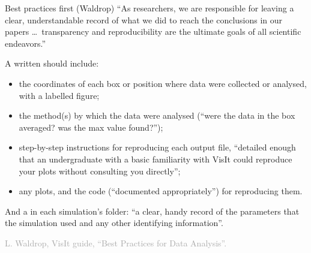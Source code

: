 \documentclass[aspectratio=169,11pt]{beamer}
\newcommand{\sourcecredit}[1]{\vfill\begin{flushright}\tiny\textcolor{DarkGray}{#1}\end{flushright}}
\begin{document}
\begin{frame}{Best practices first (Waldrop)}
\label{fr:practice}
\footnotesize
``As researchers, we are responsible for leaving a clear, understandable record of what we did to reach the conclusions in our papers \dots\ transparency and reproducibility are the ultimate goals of all scientific endeavors.''

\vspace{1mm}
A written  should include:
\begin{itemize}
  \item the coordinates of each box or position where data were collected or analysed, with a labelled figure;
  \item the method(s) by which the data were analysed (``were the data in the box averaged? was the max value found?'');
  \item step-by-step instructions for reproducing each output file, ``detailed enough that an undergraduate with a basic familiarity with VisIt could reproduce your plots without consulting you directly'';
  \item any plots, and the code (``documented appropriately'') for reproducing them.
\end{itemize}
And a  in each simulation's folder: ``a clear, handy record of the parameters that the simulation used and any other identifying information''.
\sourcecredit{L. Waldrop, VisIt guide, ``Best Practices for Data Analysis''.}
\end{frame}
\end{document}
